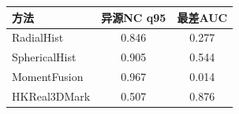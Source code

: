 \begin{tabular}{lcc}\toprule 方法 & 异源NC q95 & 最差AUC \\ \midrule
RadialHist & 0.846 & 0.277 \\
SphericalHist & 0.905 & 0.544 \\
MomentFusion & 0.967 & 0.014 \\
HKReal3DMark & 0.507 & 0.876 \\
\bottomrule\end{tabular}